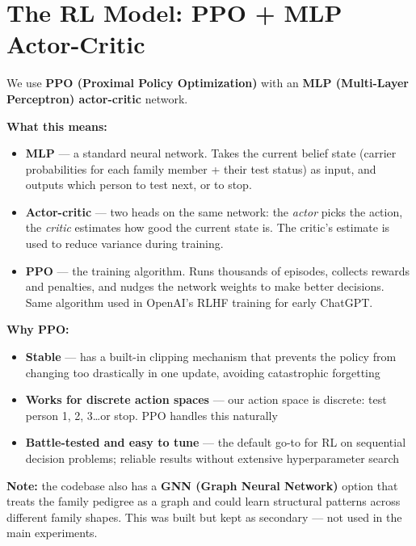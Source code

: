 \documentclass[11pt, a4paper]{article}
\begin{document}
\section{The RL Model: PPO + MLP Actor-Critic}

We use \textbf{PPO (Proximal Policy Optimization)} with an \textbf{MLP (Multi-Layer Perceptron) actor-critic} network.

\textbf{What this means:}
\begin{itemize}
  \item \textbf{MLP} — a standard neural network. Takes the current belief state
        (carrier probabilities for each family member + their test status) as input,
        and outputs which person to test next, or to stop.
  \item \textbf{Actor-critic} — two heads on the same network: the \emph{actor}
        picks the action, the \emph{critic} estimates how good the current state is.
        The critic's estimate is used to reduce variance during training.
  \item \textbf{PPO} — the training algorithm. Runs thousands of episodes, collects
        rewards and penalties, and nudges the network weights to make better decisions.
        Same algorithm used in OpenAI's RLHF training for early ChatGPT.
\end{itemize}

\textbf{Why PPO:}
\begin{itemize}
  \item \textbf{Stable} — has a built-in clipping mechanism that prevents the policy
        from changing too drastically in one update, avoiding catastrophic forgetting
  \item \textbf{Works for discrete action spaces} — our action space is discrete:
        test person 1, 2, 3\ldots or stop. PPO handles this naturally
  \item \textbf{Battle-tested and easy to tune} — the default go-to for RL on
        sequential decision problems; reliable results without extensive hyperparameter search
\end{itemize}

\textbf{Note:} the codebase also has a \textbf{GNN (Graph Neural Network)} option
that treats the family pedigree as a graph and could learn structural patterns across
different family shapes. This was built but kept as secondary — not used in the main experiments.

\end{document}

